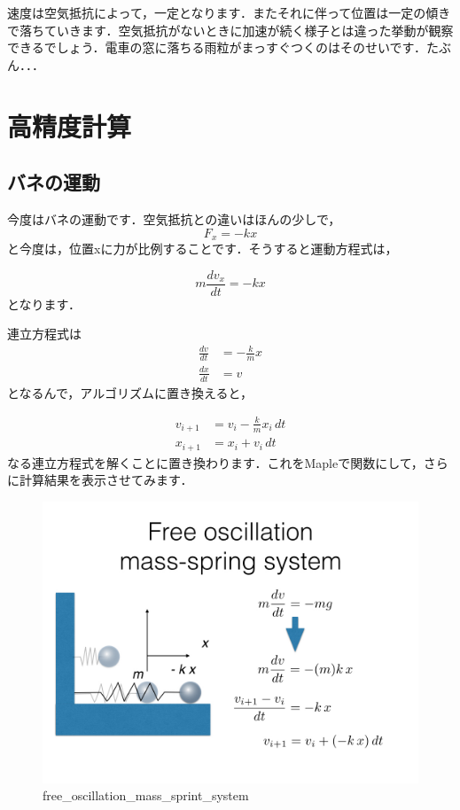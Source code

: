 \documentclass[11pt,dvipdfmx]{jsarticle}
\makeatletter
\def\maxwidth{\ifdim\Gin@nat@width>\linewidth\linewidth
    \else\Gin@nat@width\fi}
\let\Oldincludegraphics\includegraphics
\renewcommand{\includegraphics}[1]{\Oldincludegraphics[width=.8\maxwidth]{#1}}
\makeatother
\begin{document}
速度は空気抵抗によって，一定となります．またそれに伴って位置は一定の傾きで落ちていきます．空気抵抗がないときに加速が続く様子とは違った挙動が観察できるでしょう．電車の窓に落ちる雨粒がまっすぐつくのはそのせいです．たぶん．．．

    \section{高精度計算}\label{ux9ad8ux7cbeux5ea6ux8a08ux7b97}

\subsection{バネの運動}\label{ux30d0ux30cdux306eux904bux52d5}

今度はバネの運動です．空気抵抗との違いはほんの少しで， \[
F_x = -k x
\] と今度は，位置xに力が比例することです．そうすると運動方程式は，

\[
m \frac{dv_x}{dt} = - k x
\] となります．

連立方程式は \[
\begin{aligned}
\frac{dv}{dt} & = - \frac{k}{m}x \\
\frac{dx}{dt} & = v
\end{aligned}
\] となるんで，アルゴリズムに置き換えると，

\[
\begin{aligned}
v_{i+1} & = v_i - \frac{k}{m} x_i\, dt \\
x_{i+1} & = x_i + v_i\, dt
\end{aligned}
\]
なる連立方程式を解くことに置き換わります．これをMapleで関数にして，さらに計算結果を表示させてみます．

\begin{figure}[htbp]
\centering
\includegraphics{../figs/ode.004.jpeg}
\caption{free\_oscillation\_mass\_sprint\_system}
\end{figure}
\end{document}
